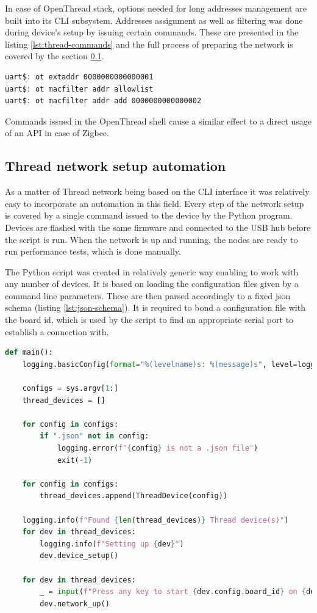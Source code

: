 In case of OpenThread stack, options needed
for long addresses management are built into its CLI subsystem. Addresses 
assignment as well as filtering was done during device's setup by issuing
certain commands. These are presented in the listing \ref{lst:thread-commands} 
and the full process of preparing the network is covered by the section \ref{sec:tests-automation}.

\begin{lstlisting}[language=bash, label={lst:thread-commands}, caption={Shell OpenThread commands for assigning and filtering IEEE addresses}]
uart$: ot extaddr 0000000000000001
uart$: ot macfilter addr allowlist
uart$: ot macfilter addr add 0000000000000002
\end{lstlisting}

Commands issued in the OpenThread shell cause a similar effect to a direct usage
of an API in case of Zigbee.

\subsection{Thread network setup automation}
\label{sec:tests-automation}

As a matter of Thread network being based on the CLI interface it was 
relatively easy to incorporate an automation in this field. Every step of 
the network setup is covered by a single command issued to the device by the
Python program. Devices are flashed with the same firmware and connected to
the USB hub before the script is run. When the network is up and running,
the nodes are ready to run performance tests, which is done manually.

The Python script was created in relatively generic way enabling to work with
any number of devices. It is based on loading the configuration files
given by a command line parameters. These are then parsed accordingly to a fixed
json schema (listing \ref{lst:json-schema}). It is required to bond a 
configuration file with the board id, which is used by the script to find an 
appropriate serial port to establish a connection with.

\medskip
\begin{lstlisting}[language=Python, label={lst:thread-automation-script}, caption={The main function of a script for Thread network setup}]
def main():
    logging.basicConfig(format="%(levelname)s: %(message)s", level=logging.DEBUG)

    configs = sys.argv[1:]
    thread_devices = []

    for config in configs:
        if ".json" not in config:
            logging.error(f"{config} is not a .json file")
            exit(-1)

    for config in configs:
        thread_devices.append(ThreadDevice(config))

    logging.info(f"Found {len(thread_devices)} Thread device(s)")
    for dev in thread_devices:
        logging.info(f"Setting up {dev}")
        dev.device_setup()

    for dev in thread_devices:
        _ = input(f"Press any key to start {dev.config.board_id} on {dev._find_tty()}")
        dev.network_up()
\end{lstlisting}

